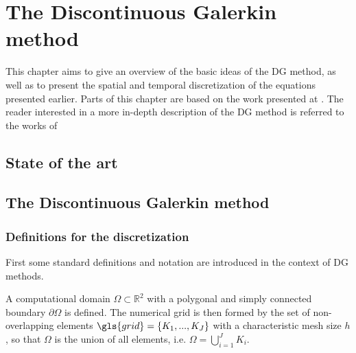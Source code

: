 \chapter{The Discontinuous Galerkin method}	\label{ch:NumericalMethods}
This chapter aims to give an overview of the basic ideas of the DG method, as well as to present the spatial and temporal discretization of the equations presented earlier. Parts of this chapter are based on the work presented at \parencite{kummerExtendedDiscontinuousGalerkin2017,kikkerFullyCoupledHighorder, smudamartinDirectNumericalSimulation2021}. The reader interested in a more in-depth description of the DG method is referred to the works of  \parencite{cockburnDevelopmentDiscontinuousGalerkin2000,hesthavenNodalDiscontinuousGalerkin2008,dipietroMathematicalAspectsDiscontinuous2012}

\section{State of the art}


\section{The Discontinuous Galerkin method}

\subsection{Definitions for the discretization} \label{ssec:SpatDiscretization}
First some standard definitions and notation are introduced in the context of DG methods. 

A computational domain $\Omega \subset \mathbb{R}^2$ with a polygonal and simply connected boundary $\partial \Omega$ is defined. The numerical grid is then formed by the set of non-overlapping elements $\gls{grid} = \{K_1, ..., K_J\}$ with a characteristic mesh size $h$, so that $\Omega$ is the union of all elements, i.e. $\Omega = \bigcup_{i=1}^J K_i$. 

